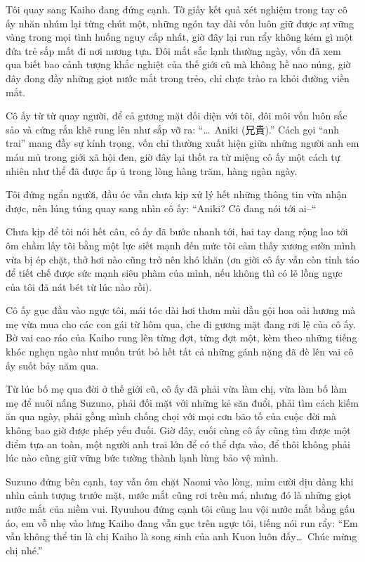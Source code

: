﻿\documentclass[../main.tex]{subfiles}
\begin{document}
Tôi quay sang Kaiho đang đứng cạnh. Tờ giấy kết quả xét nghiệm trong tay cô ấy nhăn nhúm lại từng chút một, những ngón tay dài vốn luôn giữ được sự vững vàng trong mọi tình huống nguy cấp nhất, giờ đây lại run rẩy không kém gì một đứa trẻ sắp mất đi nơi nương tựa. Đôi mắt sắc lạnh thường ngày, vốn đã xem qua biết bao cảnh tượng khắc nghiệt của thế giới cũ mà không hề nao núng, giờ đây đong đầy những giọt nước mắt trong trẻo, chỉ chực trào ra khỏi đường viền mắt.

Cô ấy từ từ quay người, để cả gương mặt đối diện với tôi, đôi môi vốn luôn sắc sảo và cứng rắn khẽ rung lên như sắp vỡ ra: ``\dots\ Aniki (兄貴).'' Cách gọi ``anh trai'' mang đầy sự kính trọng, vốn chỉ thường xuất hiện giữa những người anh em máu mủ trong giới xã hội đen, giờ đây lại thốt ra từ miệng cô ấy một cách tự nhiên như thể đã được ấp ủ trong lòng hàng trăm, hàng ngàn ngày.

Tôi đứng ngẩn người, đầu óc vẫn chưa kịp xử lý hết những thông tin vừa nhận được, nên lúng túng quay sang nhìn cô ấy: ``Aniki? Cô đang nói tới ai--``

Chưa kịp để tôi nói hết câu, cô ấy đã bước nhanh tới, hai tay dang rộng lao tới ôm chầm lấy tôi bằng một lực siết mạnh đến mức tôi cảm thấy xương sườn mình vừa bị ép chặt, thở hơi nào cũng trở nên khó khăn (ơn giời cô ấy vẫn còn tỉnh táo để tiết chế được sức mạnh siêu phàm của mình, nếu không thì có lẽ lồng ngực của tôi đã nát bét từ lúc nào rồi).

Cô ấy gục đầu vào ngực tôi, mái tóc dài hơi thơm mùi dầu gội hoa oải hương mà mẹ vừa mua cho các con gái từ hôm qua, che đi gương mặt đang rơi lệ của cô ấy. Bờ vai cao ráo của Kaiho rung lên từng đợt, từng đợt một, kèm theo những tiếng khóc nghẹn ngào như muốn trút bỏ hết tất cả những gánh nặng đã đè lên vai cô ấy suốt bảy năm qua.

Từ lúc bố mẹ qua đời ở thế giới cũ, cô ấy đã phải vừa làm chị, vừa làm bố làm mẹ để nuôi nấng Suzuno, phải đối mặt với những kẻ săn đuổi, phải tìm cách kiếm ăn qua ngày, phải gồng mình chống chọi với mọi cơn bão tố của cuộc đời mà không bao giờ được phép yếu đuối. Giờ đây, cuối cùng cô ấy cũng tìm được một điểm tựa an toàn, một người anh trai lớn để có thể dựa vào, để thôi không phải lúc nào cũng giữ vững bức tường thành lạnh lùng bảo vệ mình.

Suzuno đứng bên cạnh, tay vẫn ôm chặt Naomi vào lòng, mỉm cười dịu dàng khi nhìn cảnh tượng trước mặt, nước mắt cũng rơi trên má, nhưng đó là những giọt nước mắt của niềm vui. Ryuuhou đứng cạnh tôi cũng lau vội nước mắt bằng gấu áo, em vỗ nhẹ vào lưng Kaiho đang vẫn gục trên ngực tôi, tiếng nói run rẩy: ``Em vẫn không thể tin là chị Kaiho là song sinh của anh Kuon luôn đấy\dots\ Chúc mừng chị nhé.''
\end{document}
